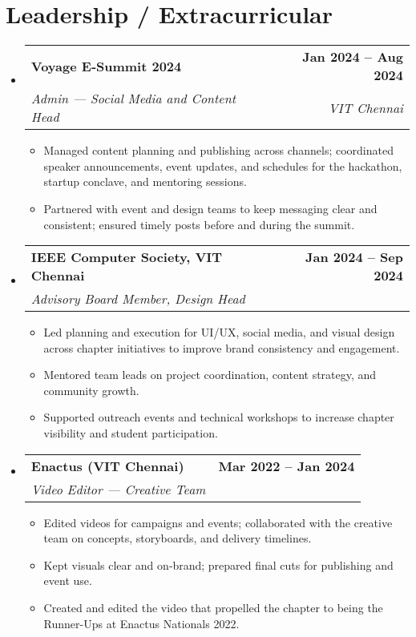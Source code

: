 \documentclass[letterpaper,11pt]{article}
\makeatletter
\newcommand{\resumeItem}[1]{
  \item\small{{#1 \vspace{-2pt}}}
}
\newcommand{\resumeSubheading}[4]{
  \vspace{-2pt}\item
    \begin{tabular*}{1.0\textwidth}[t]{l@{\extracolsep{\fill}}r}
      \textbf{#1} & \textbf{\small #2} \\
      \textit{\small#3} & \textit{\small #4} \\
    \end{tabular*}\vspace{-7pt}
}
\newcommand{\resumeSubHeadingListStart}{\begin{itemize}[leftmargin=0.0in, label={}]}
\newcommand{\resumeSubHeadingListEnd}{\end{itemize}}
\newcommand{\resumeItemListStart}{\begin{itemize}}
\newcommand{\resumeItemListEnd}{\end{itemize}\vspace{-5pt}}
\makeatother
\begin{document}
\section{Leadership / Extracurricular}
  \resumeSubHeadingListStart
    \resumeSubheading
      {Voyage E‑Summit 2024}{Jan 2024 -- Aug 2024}
      {Admin — Social Media and Content Head}{VIT Chennai}
      \resumeItemListStart
        \resumeItem{Managed content planning and publishing across channels; coordinated speaker announcements, event updates, and schedules for the hackathon, startup conclave, and mentoring sessions.}
        \resumeItem{Partnered with event and design teams to keep messaging clear and consistent; ensured timely posts before and during the summit.}
      \resumeItemListEnd

    \resumeSubheading
      {IEEE Computer Society, VIT Chennai}{Jan 2024 -- Sep 2024}
      {Advisory Board Member, Design Head}{}
      \resumeItemListStart
        \resumeItem{Led planning and execution for UI/UX, social media, and visual design across chapter initiatives to improve brand consistency and engagement.}
        \resumeItem{Mentored team leads on project coordination, content strategy, and community growth.}
        \resumeItem{Supported outreach events and technical workshops to increase chapter visibility and student participation.}
      \resumeItemListEnd

    \resumeSubheading
      {Enactus (VIT Chennai)}{Mar 2022 -- Jan 2024}
      {Video Editor — Creative Team}{}
      \resumeItemListStart
        \resumeItem{Edited videos for campaigns and events; collaborated with the creative team on concepts, storyboards, and delivery timelines.}
        \resumeItem{Kept visuals clear and on‑brand; prepared final cuts for publishing and event use.}
        \resumeItem{Created and edited the video that propelled the chapter to being the Runner-Ups at Enactus Nationals 2022.}
      \resumeItemListEnd
  \resumeSubHeadingListEnd

\end{document}
